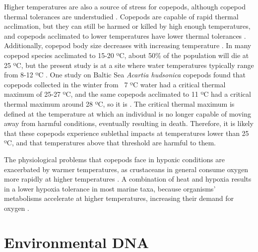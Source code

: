 \documentclass[12pt,twoside]{reedthesis}
\begin{document}
{Higher temperatures are also a source of stress for copepods, although copepod thermal tolerances are understudied \autocite{Sasaki2021}. Copepods are capable of rapid thermal acclimation, but they can still be harmed or killed by high enough temperatures, and copepods acclimated to lower temperatures have lower thermal tolerances \autocite{Sasaki2021, Hahn2024}.  Additionally, copepod body size decreases with increasing temperature \autocite{Hahn2024}.  In many copepod species acclimated to 15-20 ºC, about 50\% of the population will die at 25 ºC, but the present study is at a site where water temperatures typically range from 8-12 ºC \autocite{Sasaki2019, Sunar2021, Jiang2009}. One study on Baltic Sea \textit{Acartia hudsonica} copepods found that copepods collected in the winter from ~7 ºC water had a critical thermal maximum of 25-27 ºC, and the same copepods acclimated to 11 ºC had a critical thermal maximum around 28 ºC, so it is \autocite{Hahn2024}. The critical thermal maximum is defined at the temperature at which an individual is no longer capable of moving away from harmful conditions, eventually resulting in death. Therefore, it is likely that these copepods experience sublethal impacts at temperatures lower than 25 ºC, and that temperatures above that threshold are harmful to them. 

The physiological problems that copepods face in hypoxic conditions are exacerbated by warmer temperatures, as crustaceans in general consume oxygen more rapidly at higher temperatures \autocite{Vaquer-Sunyer2011}. A combination of heat and hypoxia results in a lower hypoxia tolerance in most marine taxa, because organisms' metabolisms accelerate at higher temperatures, increasing their demand for oxygen \autocite{Deutsch2024}. 

\clearpage 

\section{Environmental DNA}\label{IntroeDNA}

}
\end{document}
